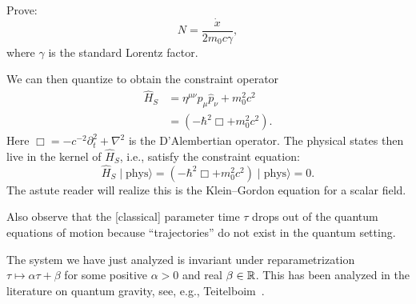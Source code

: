 \begin{exercise}
Prove:
\begin{equation}
N = \frac{\dot{x}}{2m_{0}c\gamma},
\end{equation}
where $\gamma$ is the standard Lorentz factor.
\end{exercise}

We can then quantize to obtain the constraint operator
\begin{equation}
  \begin{split}
\widehat{H}_{S} &= \eta^{\mu\nu}\widehat{p}_{\mu}\widehat{p}_{\nu}+m_{0}^{2}c^{2}\\
&= (-\hbar^{2}\Box + m_{0}^{2}c^{2}).
  \end{split}
\end{equation}
Here $\Box = -c^{-2}\partial_{t}^{2} + \nabla^{2}$ is the D'Alembertian
operator.
The physical states then live in the kernel of $\widehat{H}_{S}$, i.e.,
satisfy the constraint equation:
\begin{equation}
\widehat{H}_{S}\mid\mbox{phys}\rangle = 
(-\hbar^{2}\Box + m_{0}^{2}c^{2})\mid\mbox{phys}\rangle = 0.
\end{equation}
The astute reader will realize this is the Klein--Gordon equation for a
scalar field.

Also observe that the [classical] parameter time $\tau$ drops out of the
quantum equations of motion because ``trajectories'' do not exist in the
quantum setting.

The system we have just analyzed is invariant under reparametrization
$\tau\mapsto\alpha\tau+\beta$ for some positive $\alpha>0$ and
real $\beta\in\mathbb{R}$.
This has been analyzed in the literature on quantum gravity, see, e.g.,
Teitelboim~\cite{Teitelboim:1981ua}.
